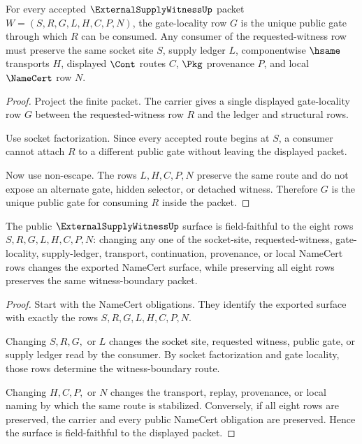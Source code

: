 \begin{theorem}
\label{thm:external-supply-witness-gate-locality}
For every accepted $\ExternalSupplyWitnessUp$ packet $W=(S,R,G,L,H,C,P,N)$, the gate-locality row $G$ is the unique public gate through which $R$ can be consumed. Any consumer of the requested-witness row must preserve the same socket site $S$, supply ledger $L$, componentwise $\hsame$ transports $H$, displayed $\Cont$ routes $C$, $\Pkg$ provenance $P$, and local $\NameCert$ row $N$.
\end{theorem}
\begin{proof}
Project the finite packet. The carrier gives a single displayed gate-locality row $G$ between the requested-witness row $R$ and the ledger and structural rows.

Use socket factorization. Since every accepted route begins at $S$, a consumer cannot attach $R$ to a different public gate without leaving the displayed packet.

Now use non-escape. The rows $L,H,C,P,N$ preserve the same route and do not expose an alternate gate, hidden selector, or detached witness. Therefore $G$ is the unique public gate for consuming $R$ inside the packet.
\end{proof}

\begin{theorem}
\label{thm:external-supply-witness-field-faithful-surface}
The public $\ExternalSupplyWitnessUp$ surface is field-faithful to the eight rows $S,R,G,L,H,C,P,N$: changing any one of the socket-site, requested-witness, gate-locality, supply-ledger, transport, continuation, provenance, or local NameCert rows changes the exported NameCert surface, while preserving all eight rows preserves the same witness-boundary packet.
\end{theorem}
\begin{proof}
Start with the NameCert obligations. They identify the exported surface with exactly the rows $S,R,G,L,H,C,P,N$.

Changing $S,R,G,$ or $L$ changes the socket site, requested witness, public gate, or supply ledger read by the consumer. By socket factorization and gate locality, those rows determine the witness-boundary route.

Changing $H,C,P,$ or $N$ changes the transport, replay, provenance, or local naming by which the same route is stabilized. Conversely, if all eight rows are preserved, the carrier and every public NameCert obligation are preserved. Hence the surface is field-faithful to the displayed packet.
\end{proof}

